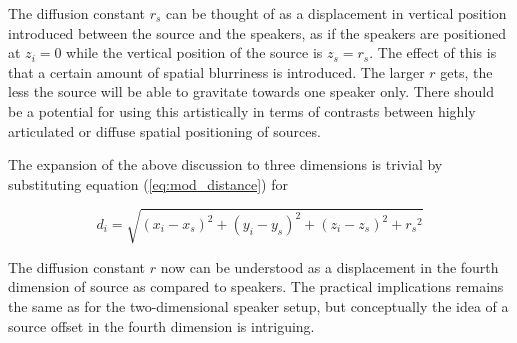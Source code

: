 \documentclass[twoside,10pt]{article}
\begin{document}
The diffusion constant $r_{s}$ can be thought of as a displacement in vertical position introduced between the source and the speakers, as if the speakers are positioned at $z_{i}=0$ while the vertical position of the source is $z_{s}=r_{s}$. The effect of this is that a certain amount of spatial blurriness is introduced. The larger $r$ gets, the less the source will be able to gravitate towards one speaker only. There should be a potential for using this artistically in terms of contrasts between highly articulated or diffuse spatial positioning of sources.

The expansion of the above discussion to three dimensions is trivial by substituting equation (\ref{eq:mod_distance}) for

\begin{equation} \label{eq:3D_mod_distance}
d_{i} = \sqrt{ {(x_{i} - x_{s})}^2 + {(y_{i} - y_{s})}^2 + {(z_{i} - z_{s})}^2 + {r_{s}}^2}
\end{equation}

The diffusion constant $r$ now can be understood as a displacement in the fourth dimension of source as compared to speakers. The practical implications remains the same as for the two-dimensional speaker setup, but conceptually the idea of a source offset in the fourth dimension is intriguing.









%
%














\end{document}
